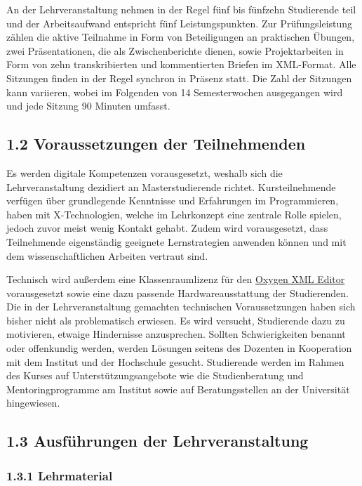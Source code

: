 \documentclass[
          a4paper,
        ]{article}
\begin{document}
An der Lehrveranstaltung nehmen in der Regel fünf bis fünfzehn
Studierende teil und der Arbeitsaufwand entspricht fünf
Leistungspunkten. Zur Prüfungsleistung zählen die aktive Teilnahme in
Form von Beteiligungen an praktischen Übungen, zwei Präsentationen, die
als Zwischenberichte dienen, sowie Projektarbeiten in Form von zehn
transkribierten und kommentierten Briefen im XML-Format. Alle Sitzungen
finden in der Regel synchron in Präsenz statt. Die Zahl der Sitzungen
kann variieren, wobei im Folgenden von 14 Semesterwochen ausgegangen
wird und jede Sitzung 90 Minuten umfasst.

\subsection{1.2 Voraussetzungen der
Teilnehmenden}\label{voraussetzungen-der-teilnehmenden}

Es werden digitale Kompetenzen vorausgesetzt, weshalb sich die
Lehrveranstaltung dezidiert an Masterstudierende richtet.
Kursteilnehmende verfügen über grundlegende Kenntnisse und Erfahrungen
im Programmieren, haben mit X-Technologien, welche im Lehrkonzept eine
zentrale Rolle spielen, jedoch zuvor meist wenig Kontakt gehabt. Zudem
wird vorausgesetzt, dass Teilnehmende eigenständig geeignete
Lernstrategien anwenden können und mit dem wissenschaftlichen Arbeiten
vertraut sind.

Technisch wird außerdem eine Klassenraumlizenz für den
\href{https://www.oxygenxml.com/}{Oxygen XML Editor} vorausgesetzt sowie
eine dazu passende Hardwareausstattung der Studierenden. Die in der
Lehrveranstaltung gemachten technischen Voraussetzungen haben sich
bisher nicht als problematisch erwiesen. Es wird versucht, Studierende
dazu zu motivieren, etwaige Hindernisse anzusprechen. Sollten
Schwierigkeiten benannt oder offenkundig werden, werden Lösungen seitens
des Dozenten in Kooperation mit dem Institut und der Hochschule gesucht.
Studierende werden im Rahmen des Kurses auf Unterstützungsangebote wie
die Studienberatung und Mentoringprogramme am Institut sowie auf
Beratungsstellen an der Universität hingewiesen.

\subsection{1.3 Ausführungen der
Lehrveranstaltung}\label{ausfuxfchrungen-der-lehrveranstaltung}

\subsubsection{1.3.1 Lehrmaterial}\label{lehrmaterial}
\end{document}
